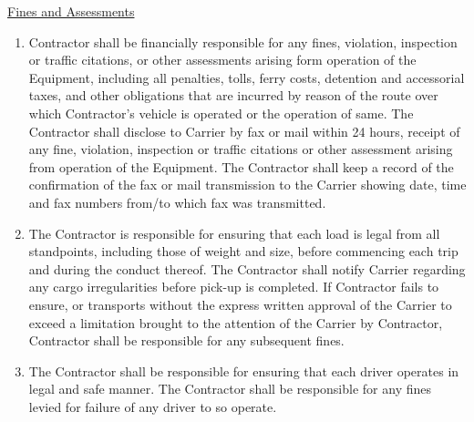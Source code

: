 \underline{Fines and Assessments}
\begin{enumerate}[
    ref = \SecondLevelEnumerator
]
    \item Contractor shall be financially responsible for any fines,
    violation, inspection or traffic citations, or other assessments
    arising form operation of the Equipment, including all penalties,
    tolls, ferry costs, detention and accessorial taxes, and other
    obligations that are incurred by reason of the route over which
    Contractor's vehicle is operated or the operation of same. The
    Contractor shall disclose to Carrier by fax or mail within 24 hours,
    receipt of any fine, violation, inspection or traffic citations or
    other assessment arising from operation of the Equipment. The
    Contractor shall keep a record of the confirmation of the fax or mail
    transmission to the Carrier showing date, time and fax numbers from/to
    which fax was transmitted.

    \item The Contractor is responsible for ensuring that each load is
    legal from all standpoints, including those of weight and size, before
    commencing each trip and during the conduct thereof. The Contractor
    shall notify Carrier regarding any cargo irregularities before pick-up
    is completed. If Contractor fails to ensure, or transports without the
    express written approval of the Carrier to exceed a limitation brought
    to the attention of the Carrier by Contractor, Contractor shall be
    responsible for any subsequent fines.

    \item The Contractor shall be responsible for ensuring that each driver
    operates in legal and safe manner. The Contractor shall be responsible
    for any fines levied for failure of any driver to so operate.
\end{enumerate}